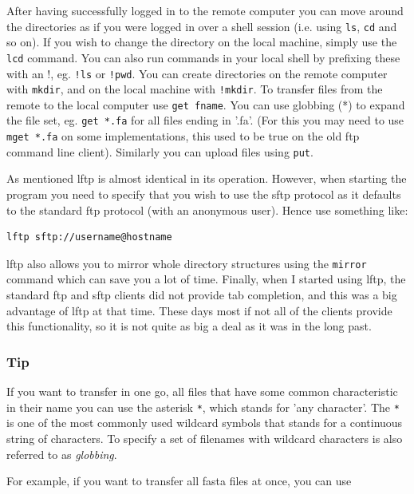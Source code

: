 \documentclass[11pt]{article}
\begin{document}
After having successfully logged in to the remote computer you can move
around the directories as if you were logged in over a shell session
(i.e. using \texttt{ls}, \texttt{cd} and so on). If you wish to change the directory
on the local machine, simply use the \texttt{lcd} command. You can also run
commands in your local shell by prefixing these with an !, eg. \texttt{!ls} or
\texttt{!pwd}. You can create directories on the remote computer with \texttt{mkdir},
and on the local machine with \texttt{!mkdir}. To transfer files from the
remote to the local computer use \texttt{get fname}. You can use globbing (*)
to expand the file set, eg. \texttt{get *.fa} for all files ending in '.fa'.
(For this you may need to use \texttt{mget *.fa} on some implementations, this
used to be true on the old ftp command line client). Similarly you can
upload files using \texttt{put}.

As mentioned lftp is almost identical in its operation. However, when
starting the program you need to specify that you wish to use the sftp
protocol as it defaults to the standard ftp protocol (with an anonymous
user). Hence use something like:

\begin{verbatim}
lftp sftp://username@hostname
\end{verbatim}

lftp also allows you to mirror whole directory structures using the
\texttt{mirror} command which can save you a lot of time. Finally, when I
started using lftp, the standard ftp and sftp clients did not provide
tab completion, and this was a big advantage of lftp at that time. These
days most if not all of the clients provide this functionality, so it is
not quite as big a deal as it was in the long past.


\subsubsection{Tip}
\label{sec:orgheadline13}

If you want to transfer in one go, all files that have some common
characteristic in their name you can use the asterisk \texttt{*}, which
stands for 'any character'. The \texttt{*} is one of the most commonly used
wildcard symbols that stands for a continuous string of characters. To
specify a set of filenames with wildcard characters is also referred
to as \emph{globbing}.

For example, if you want to transfer all
fasta files at once, you can use
\end{document}
